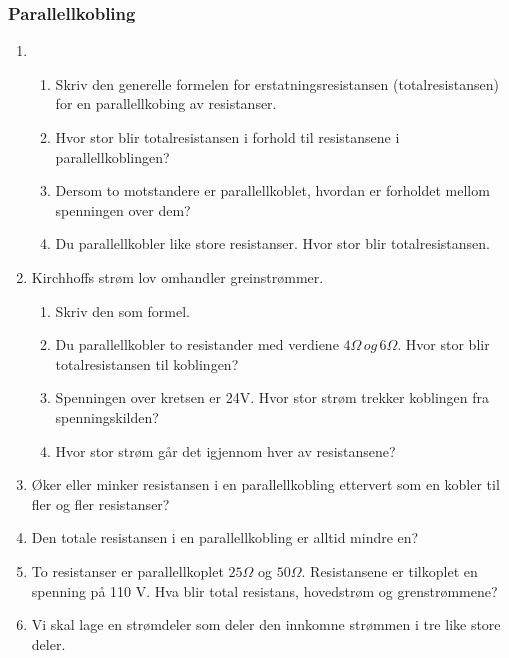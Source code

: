 \documentclass[12pt,a4paper]{article}
\begin{document}
\subsubsection{Parallellkobling}
\begin{enumerate}
\item ~

\begin{enumerate}
\item Skriv den generelle formelen for erstatningsresistansen (totalresistansen)
for en parallellkobing av resistanser.
\item Hvor stor blir totalresistansen i forhold til resistansene i parallellkoblingen?
\item Dersom to motstandere er parallellkoblet, hvordan er forholdet mellom
spenningen over dem?
\item Du parallellkobler like store resistanser. Hvor stor blir totalresistansen. 
\end{enumerate}
\item Kirchhoffs strøm lov omhandler greinstrømmer. 

\begin{enumerate}
\item Skriv den som formel.
\item Du parallellkobler to resistander med verdiene $4\Omega\,og\,6\Omega$.
Hvor stor blir totalresistansen til koblingen?
\item Spenningen over kretsen er 24V. Hvor stor strøm trekker koblingen
fra spenningskilden?
\item Hvor stor strøm går det igjennom hver av resistansene?
\end{enumerate}
\item Øker eller minker resistansen i en parallellkobling ettervert som
en kobler til fler og fler resistanser?
\item Den totale resistansen i en parallellkobling er alltid mindre en?
\item To resistanser er parallellkoplet $25\Omega$ og $50\Omega$. Resistansene
er tilkoplet en spenning på 110 V. Hva blir total resistans, hovedstrøm
og grenstrømmene?
\item Vi skal lage en strømdeler som deler den innkomne strømmen i tre like
store deler.


\end{enumerate}
\end{document}
